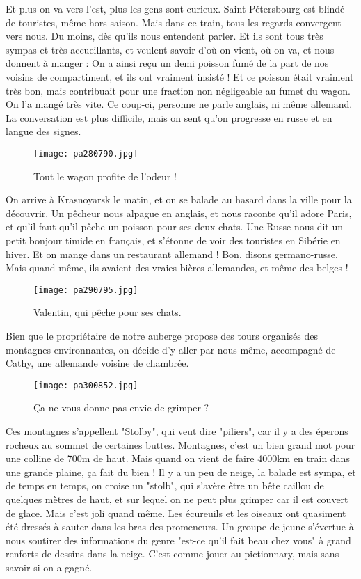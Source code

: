 \documentclass{book}
\begin{document}
Et plus on va vers l'est, plus les gens sont curieux. Saint-Pétersbourg est blindé de touristes, même hors saison. Mais dans ce train, tous les regards convergent vers nous. Du moins, dès qu'ils nous entendent parler. Et ils sont tous très sympas et très accueillants, et veulent savoir d'où on vient, où on va, et nous donnent à manger : On a ainsi reçu un demi poisson fumé de la part de nos voisins de compartiment, et ils ont vraiment insisté ! Et ce poisson était vraiment très bon, mais contribuait pour une fraction non négligeable au fumet du wagon. On l'a mangé très vite. Ce coup-ci, personne ne parle anglais, ni même allemand. La conversation est plus difficile, mais on sent qu'on progresse en russe et en langue des signes.


\begin{figure}[h]
\centering
\texttt{[image: pa280790.jpg]}
\caption*{ Tout le wagon profite de l'odeur !}
\end{figure}

On arrive à Krasnoyarsk le matin, et on se balade au hasard dans la ville pour la découvrir. Un pêcheur nous alpague en anglais, et nous raconte qu'il adore Paris, et qu'il faut qu'il pêche un poisson pour ses deux chats. Une Russe nous dit un petit bonjour timide en français, et s'étonne de voir des touristes en Sibérie en hiver. Et on mange dans un restaurant allemand ! Bon, disons germano-russe. Mais quand même, ils avaient des vraies bières allemandes, et même des belges !


\begin{figure}[h]
\centering
\texttt{[image: pa290795.jpg]}
\caption*{ Valentin, qui pêche pour ses chats.}
\end{figure}

Bien que le propriétaire de notre auberge propose des tours organisés des montagnes environnantes, on décide d'y aller par nous même, accompagné de Cathy, une allemande voisine de chambrée.


\begin{figure}[h]
\centering
\texttt{[image: pa300852.jpg]}
\caption*{ Ça ne vous donne pas envie de grimper ?}
\end{figure}

Ces montagnes s'appellent "Stolby", qui veut dire "piliers", car il y a des éperons rocheux au sommet de certaines buttes. Montagnes, c'est un bien grand mot pour une colline de 700m de haut. Mais quand on vient de faire 4000km en train dans une grande plaine, ça fait du bien ! Il y a un peu de neige, la balade est sympa, et de temps en temps, on croise un "stolb", qui s'avère être un bête caillou de quelques mètres de haut, et sur lequel on ne peut plus grimper car il est couvert de glace. Mais c'est joli quand même. Les écureuils et les oiseaux ont quasiment été dressés à sauter dans les bras des promeneurs. Un groupe de jeune s'évertue à nous soutirer des informations du genre "est-ce qu'il fait beau chez vous" à grand renforts de dessins dans la neige. C'est comme jouer au pictionnary, mais sans savoir si on a gagné.
\end{document}
